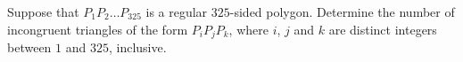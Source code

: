 Suppose that $P_1P_2\ldots P_{325}$ is a regular $325$-sided polygon. Determine the number of incongruent triangles of the form $P_iP_jP_k$, where $i$, $j$ and $k$ are distinct integers between $1$ and $325$, inclusive.
